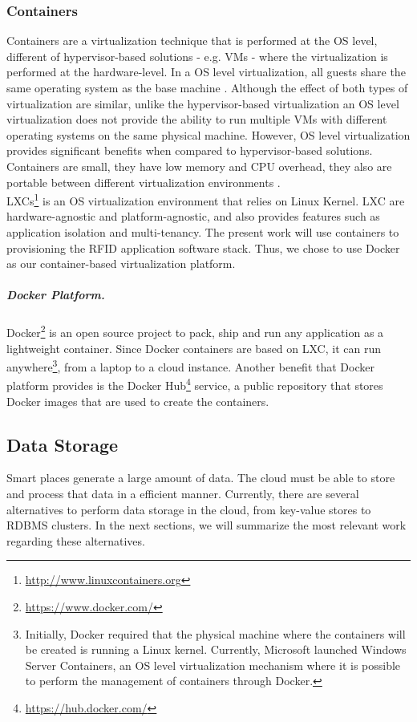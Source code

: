 \subsubsection{Containers}
\label{subs:containers}
Containers are a virtualization technique that is performed at the \gls{OS} level, different of
hypervisor-based solutions - e.g. \glspl{VM} - where the virtualization is performed at the hardware-level.
In a \gls{OS} level virtualization, all guests share the same operating system as the base machine \cite{matthews2007quantifying}.
Although the effect of both types of virtualization are similar, unlike the hypervisor-based virtualization
an \gls{OS} level virtualization does not provide the ability to run multiple \glspl{VM} with different
operating systems on the same physical machine. However, \gls{OS} level virtualization provides significant
benefits when compared to hypervisor-based solutions. Containers are small, they have low memory and
\gls{CPU} overhead, they also are portable between different virtualization environments \cite{soltesz2007container}.\\

\glspl{LXC}\footnote{\url{http://www.linuxcontainers.org}} is an \gls{OS} virtualization environment
that relies on Linux Kernel. \gls{LXC} are hardware-agnostic and platform-agnostic, and also provides
features such as application isolation and multi-tenancy. The present work will use containers to
provisioning the \gls{RFID} application software stack. Thus, we chose to use Docker as our container-based
virtualization platform.

\subparagraph{Docker Platform.}
\label{subp:docker_platform}
Docker\footnote{\url{https://www.docker.com/}} is an open source project to pack, ship and run any application as
a lightweight container. Since Docker containers are based on \gls{LXC}, it can run anywhere\footnote{Initially, Docker required that the physical
machine where the containers will be created is running a Linux kernel. Currently, Microsoft
launched Windows Server Containers, an \gls{OS} level virtualization mechanism where it is possible to
perform the management of containers through Docker.}, from a laptop to a cloud instance. Another
benefit that Docker platform provides is the Docker Hub\footnote{\url{https://hub.docker.com/}} service,
a public repository that stores Docker images that are used to create the containers.

\subsection{Data Storage}
\label{sub:data_storage}
Smart places generate a large amount of data. The cloud must be able to store and process that data
in a efficient manner. Currently, there are several alternatives to perform data storage in the cloud,
from key-value stores to \gls{RDBMS} clusters. In the next sections, we will summarize the most
relevant work regarding these alternatives.

